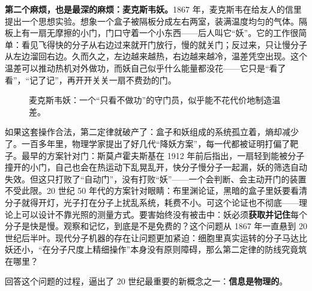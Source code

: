\textbf{第二个麻烦，也是最深的麻烦：麦克斯韦妖。}1867 年，麦克斯韦在给友人的信里提出一个思想实验。想象一个盒子被隔板分成左右两室，装满温度均匀的气体。隔板上有一扇无摩擦的小门，门口守着一个小东西——后人叫它“妖”。它的工作很简单：看见飞得快的分子从右边过来就开门放行，慢的就关门；反过来，只让慢分子从左边溜回右边。久而久之，左边越来越热，右边越来越冷，温差凭空出现。这个温差可以推动热机对外做功，而妖自己似乎什么能量都没花——它只是“看了看”，“记了记”，再开开关关一扇不费劲的门。

\begin{figure}[htbp]
\centering
{}
\caption{麦克斯韦妖：一个“只看不做功”的守门员，似乎能不花代价地制造温差。}
\end{figure}

如果这套操作合法，第二定律就破产了：盒子和妖组成的系统孤立着，熵却减少了。一百多年里，物理学家提出了好几代“降妖方案”，每一代都被证明打偏了靶子。最早的方案针对门：斯莫卢霍夫斯基在 1912 年前后指出，一扇轻到能被分子撞开的小门，自己也会在热运动下乱晃乱开，快分子慢分子一起漏，妖的筛选自动失效。但这只打败了“自动门”，没有打败“妖”——一个会判断、会主动开门的装置不受此限。20 世纪 50 年代的方案针对眼睛：布里渊论证，黑暗的盒子里妖要看清分子就得开灯，光子打在分子上扰乱系统，耗费不小。可这个论证也不彻底——理论上可以设计不靠光照的测量方式。要害始终没有被击中：妖必须\textbf{获取并记住}每个分子是快是慢。观察和记忆，到底是不是免费的？这个问题从 1867 年一直悬到 20 世纪后半叶。现代分子机器的存在让问题更加紧迫：细胞里真实运转的分子马达比妖还小，“在分子尺度上精细操作”本身没有原则障碍，那么第二定律的防线究竟筑在哪里？


回答这个问题的过程，逼出了 20 世纪最重要的新概念之一：\textbf{信息是物理的}。


